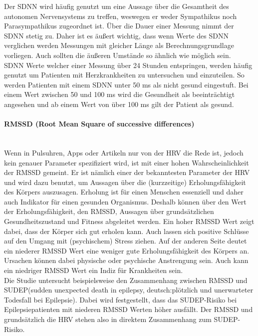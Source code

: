 Der SDNN wird häufig genutzt um eine Aussage über die Gesamtheit des autonomen Nervensystems zu treffen, weswegen er weder Sympathikus noch Parasympathikus zugeordnet ist.\cite[S.22]{babilon}  Über die Dauer einer Messung nimmt der SDNN stetig zu. Daher ist es äußert wichtig, dass wenn Werte des SDNN verglichen werden Messungen mit gleicher Länge als Berechnungsgrundlage vorliegen. Auch sollten die äußeren Umstände so ähnlich wie möglich sein.\cite{zeit}\\
SDNN Werte welcher einer Messung über 24 Stunden entspringen, werden häufig genutzt um Patienten mit Herzkrankheiten zu untersuchen und einzuteilen. So werden Patienten mit einem SDNN unter 50 ms als nicht gesund eingestuft. Bei einem Wert zwischen 50 und 100 ms wird die Gesundheit als beeinträchtigt angesehen und ab einem Wert von über 100 ms gilt der Patient als gesund. \cite[S.4]{med}  

\paragraph{RMSSD (Root Mean Square of successive differences)}\mbox{} \\
Wenn in Pulsuhren, Apps oder Artikeln nur von der HRV die Rede ist, jedoch kein genauer Parameter spezifiziert wird, ist mit einer hohen Wahrscheinlichkeit der RMSSD gemeint. Er ist nämlich einer der bekanntesten Parameter der HRV und wird dazu benutzt, um Aussagen über die (kurzzeitige) Erholungsfähigkeit des Körpers auszusagen. Erholung ist für einen Menschen essenziell und daher auch Indikator für einen gesunden Organismus. Deshalb können über den Wert der Erholungsfähigkeit, den RMSSD, Aussagen über grundsätzlichen Gesundheitszustand und Fitness abgeleitet werden.
Ein hoher RMSSD Wert zeigt dabei, dass der Körper sich gut erholen kann. Auch lassen sich positive Schlüsse auf den Umgang mit (psychischem) Stress ziehen. 
Auf der anderen Seite deutet ein niederer RMSSD Wert eine weniger gute Erholungsfähigkeit des Körpers an. Ursachen können dabei physische oder psychische Anstrengung sein. Auch kann ein niedriger RMSSD Wert ein Indiz für Krankheiten sein.\\
 Die Studie \cite{sudep} untersucht beispielsweise den Zusammenhang zwischen RMSSD und SUDEP(sudden unexpected death in epilepsy, deutsch:plötzlich und unerwarteter Todesfall bei Epilepsie). Dabei wird festgestellt, dass das SUDEP-Risiko bei Epilepsiepatienten mit niederen RMSSD Werten höher ausfällt. Der RMSSD und grundsätzlich die HRV stehen also in direktem Zusammenhang zum SUDEP-Risiko. 

